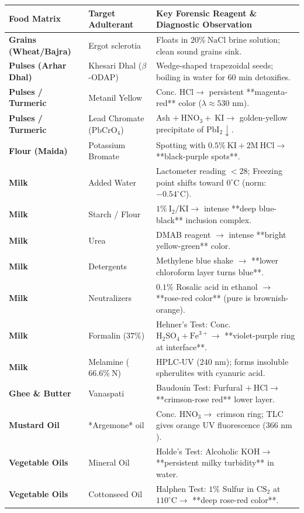 \documentclass[10pt,a4paper,oneside]{article}
\begin{document}
\begin{center}
\small
\begin{tabular}{@{}p{3.2cm} p{3.8cm} p{10.0cm}@{}}
\toprule
\textbf{Food Matrix} & \textbf{Target Adulterant} & \textbf{Key Forensic Reagent \& Diagnostic Observation} \tabularnewline
\midrule
\textbf{Grains (Wheat/Bajra)} & Ergot sclerotia & Floats in $20\%\ \mathrm{NaCl}$ brine solution; clean sound grains sink. \tabularnewline
\textbf{Pulses (Arhar Dhal)} & Khesari Dhal ($\beta$-ODAP) & Wedge-shaped trapezoidal seeds; boiling in water for 60 min detoxifies. \tabularnewline
\textbf{Pulses / Turmeric} & Metanil Yellow & Conc. $\mathrm{HCl} \rightarrow$ persistent **magenta-red** color ($\lambda \approx 530\text{ nm}$). \tabularnewline
\textbf{Pulses / Turmeric} & Lead Chromate ($\mathrm{PbCrO_4}$) & Ash $+\ \mathrm{HNO_3} +\ \mathrm{KI} \rightarrow$ golden-yellow precipitate of $\mathrm{PbI_2}\downarrow$. \tabularnewline
\textbf{Flour (Maida)} & Potassium Bromate & Spotting with $0.5\%\ \mathrm{KI} + 2\mathrm{M}\ \mathrm{HCl} \rightarrow$ **black-purple spots**. \tabularnewline
\textbf{Milk} & Added Water & Lactometer reading $<28$; Freezing point shifts toward $0^\circ\text{C}$ (norm: $-0.54^\circ\text{C}$). \tabularnewline
\textbf{Milk} & Starch / Flour & $1\%\ \mathrm{I_2 / KI} \rightarrow$ intense **deep blue-black** inclusion complex. \tabularnewline
\textbf{Milk} & Urea & DMAB reagent $\rightarrow$ intense **bright yellow-green** color. \tabularnewline
\textbf{Milk} & Detergents & Methylene blue shake $\rightarrow$ **lower chloroform layer turns blue**. \tabularnewline
\textbf{Milk} & Neutralizers & $0.1\%$ Rosalic acid in ethanol $\rightarrow$ **rose-red color** (pure is brownish-orange). \tabularnewline
\textbf{Milk} & Formalin ($37\%$) & Hehner's Test: Conc. $\mathrm{H_2SO_4} + \mathrm{Fe}^{3+} \rightarrow$ **violet-purple ring at interface**. \tabularnewline
\textbf{Milk} & Melamine ($66.6\%\ \mathrm{N}$) & HPLC-UV ($240\text{ nm}$); forms insoluble spherulites with cyanuric acid. \tabularnewline
\textbf{Ghee \& Butter} & Vanaspati & Baudouin Test: Furfural $+\ \mathrm{HCl} \rightarrow$ **crimson-rose red** lower layer. \tabularnewline
\textbf{Mustard Oil} & *Argemone* oil & Conc. $\mathrm{HNO_3} \rightarrow$ crimson ring; TLC gives orange UV fluorescence ($366\text{ nm}$). \tabularnewline
\textbf{Vegetable Oils} & Mineral Oil & Holde's Test: Alcoholic $\mathrm{KOH} \rightarrow$ **persistent milky turbidity** in water. \tabularnewline
\textbf{Vegetable Oils} & Cottonseed Oil & Halphen Test: $1\%$ Sulfur in $\mathrm{CS_2}$ at $110^\circ\text{C} \rightarrow$ **deep rose-red color**. \tabularnewline

\end{tabular}
\end{center}
\end{document}
